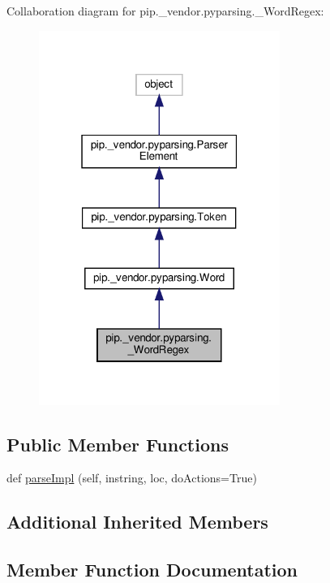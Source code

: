 Collaboration diagram for pip.\+\_\+vendor.\+pyparsing.\+\_\+\+Word\+Regex\+:
\nopagebreak
\begin{figure}[H]
\begin{center}
\leavevmode
\includegraphics[width=223pt]{classpip_1_1__vendor_1_1pyparsing_1_1__WordRegex__coll__graph}
\end{center}
\end{figure}
\subsection*{Public Member Functions}
\begin{DoxyCompactItemize}
\item 
def \hyperlink{classpip_1_1__vendor_1_1pyparsing_1_1__WordRegex_ab46a676c9b0dcf01eb405f1331dfb884}{parse\+Impl} (self, instring, loc, do\+Actions=True)
\end{DoxyCompactItemize}
\subsection*{Additional Inherited Members}


\subsection{Member Function Documentation}
\mbox{\label{classpip_1_1__vendor_1_1pyparsing_1_1__WordRegex_ab46a676c9b0dcf01eb405f1331dfb884}} 
